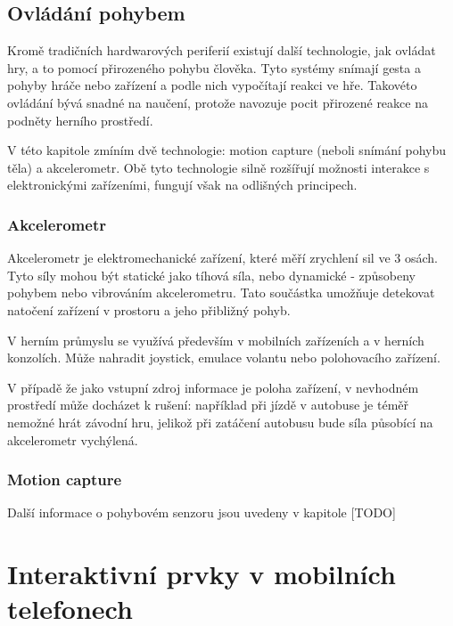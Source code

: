 \documentclass[thesis=B,czech,hidelinks]{FITthesis}[2012/06/26] %
\begin{document}
\section{Ovládání pohybem}
\label{section:motion_sensing}

Kromě tradičních hardwarových periferií existují další technologie, jak ovládat hry, a to pomocí přirozeného pohybu člověka. Tyto systémy snímají gesta a pohyby hráče nebo zařízení a podle nich vypočítají reakci ve hře. Takovéto ovládání bývá snadné na naučení, protože navozuje pocit přirozené reakce na podněty herního prostředí.

V této kapitole zmíním dvě technologie: motion capture (neboli snímání pohybu těla) a akcelerometr. Obě tyto technologie silně rozšířují možnosti interakce s elektronickými zařízeními, fungují však na odlišných principech.

\subsection{Akcelerometr}

Akcelerometr je elektromechanické zařízení, které měří zrychlení sil ve 3 osách. Tyto síly mohou být statické jako tíhová síla, nebo dynamické - způsobeny pohybem nebo vibrováním akcelerometru.\cite{acc} Tato součástka umožňuje detekovat natočení zařízení v prostoru a jeho přibližný pohyb.

V herním průmyslu se využívá především v mobilních zařízeních a v herních konzolích. Může nahradit joystick, emulace volantu nebo polohovacího zařízení. 

V případě že jako vstupní zdroj informace je poloha zařízení, v nevhodném prostředí může docházet k rušení: například při jízdě v autobuse je téměř nemožné hrát závodní hru, jelikož při zatáčení autobusu bude síla působící na akcelerometr vychýlená.

\subsection{Motion capture}




Další informace o pohybovém senzoru jsou uvedeny v kapitole [TODO]







\chapter{Interaktivní prvky v mobilních telefonech}
\end{document}
